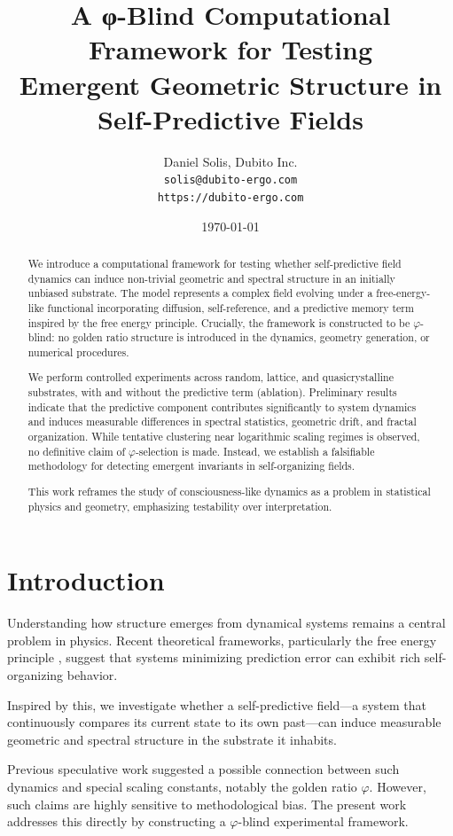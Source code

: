 \documentclass[twocolumn]{article}
\title{A φ-Blind Computational Framework for Testing\\
Emergent Geometric Structure in Self-Predictive Fields}
\author{
Daniel Solis, Dubito Inc. \\
\texttt{solis@dubito-ergo.com} \\
\texttt{https://dubito-ergo.com}
}
\date{\today}
\begin{document}
\maketitle

\begin{abstract}
We introduce a computational framework for testing whether self-predictive field dynamics can induce non-trivial geometric and spectral structure in an initially unbiased substrate. The model represents a complex field evolving under a free-energy-like functional incorporating diffusion, self-reference, and a predictive memory term inspired by the free energy principle. Crucially, the framework is constructed to be $\varphi$-blind: no golden ratio structure is introduced in the dynamics, geometry generation, or numerical procedures.

We perform controlled experiments across random, lattice, and quasicrystalline substrates, with and without the predictive term (ablation). Preliminary results indicate that the predictive component contributes significantly to system dynamics and induces measurable differences in spectral statistics, geometric drift, and fractal organization. While tentative clustering near logarithmic scaling regimes is observed, no definitive claim of $\varphi$-selection is made. Instead, we establish a falsifiable methodology for detecting emergent invariants in self-organizing fields.

This work reframes the study of consciousness-like dynamics as a problem in statistical physics and geometry, emphasizing testability over interpretation.
\end{abstract}

\section{Introduction}

Understanding how structure emerges from dynamical systems remains a central problem in physics. Recent theoretical frameworks, particularly the free energy principle \cite{friston2010}, suggest that systems minimizing prediction error can exhibit rich self-organizing behavior.

Inspired by this, we investigate whether a self-predictive field---a system that continuously compares its current state to its own past---can induce measurable geometric and spectral structure in the substrate it inhabits.

Previous speculative work suggested a possible connection between such dynamics and special scaling constants, notably the golden ratio $\varphi$. However, such claims are highly sensitive to methodological bias. The present work addresses this directly by constructing a $\varphi$-blind experimental framework.
\end{document}
